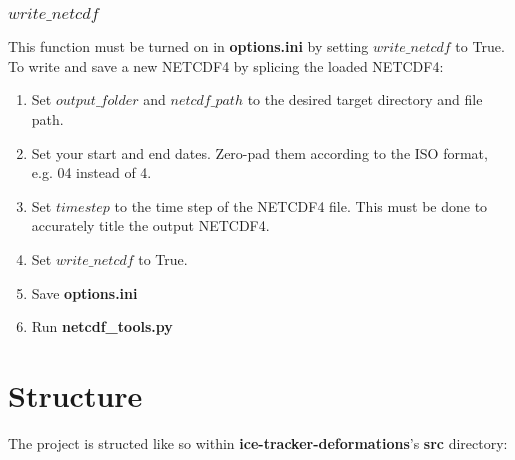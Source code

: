 \documentclass[12pt]{article}
\begin{document}
\subsubsection*{$write\_netcdf$}

This function must be turned on in \textbf{options.ini} by setting $write\_netcdf$ to True. To write and save a new NETCDF4 by splicing the loaded NETCDF4:

\begin{enumerate}
    \item Set $output\_folder$ and $netcdf\_path$ to the desired target directory and file path.
    \item Set your start and end dates. Zero-pad them according to the ISO format, e.g. 04 instead of 4.
    \item Set $timestep$ to the time step of the NETCDF4 file. This must be done to accurately title the output NETCDF4.
    \item Set $write\_netcdf$ to True.
    \item Save \textbf{options.ini}
    \item Run \textbf{netcdf\_tools.py}
\end{enumerate}

\section{Structure}\label{Structure}

The project is structed like so within \textbf{ice-tracker-deformations}'s \textbf{src} directory:

\begin{figure}[H]
    \centering
    \begin{minipage}[b]{.5\textwidth}
    \end{minipage}%
    \begin{minipage}{.5\textwidth}
    \end{minipage}
\end{figure}
\end{document}
